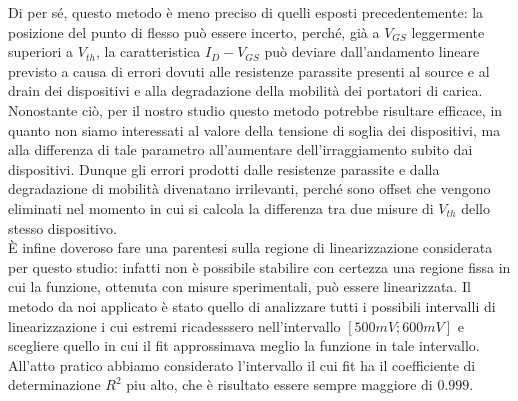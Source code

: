\documentclass[12pt, letterpaper]{book}
\begin{document}
Di per sé, questo metodo è meno preciso di quelli esposti precedentemente: la posizione del punto di flesso può essere incerto, perché, già a $V_{GS}$ leggermente superiori a $V_{th}$, la caratteristica $I_D-V_{GS}$ può deviare dall'andamento lineare previsto a causa di errori dovuti alle resistenze parassite presenti al source e al drain dei dispositivi e alla degradazione della mobilità dei portatori di carica.
Nonostante ciò, per il nostro studio questo metodo potrebbe risultare efficace, in quanto non siamo interessati al valore della tensione di soglia dei dispositivi, ma alla differenza di tale parametro all'aumentare dell'irraggiamento subito dai dispositivi. Dunque gli errori prodotti dalle resistenze parassite e dalla degradazione di mobilità divenatano irrilevanti, perché sono offset che vengono eliminati nel momento in cui si calcola la differenza tra due misure di $V_{th}$ dello stesso dispositivo.\\
È infine doveroso fare una parentesi sulla regione di linearizzazione considerata per questo studio: infatti non è possibile stabilire con certezza una regione fissa in cui la funzione, ottenuta con misure sperimentali, può essere linearizzata. Il metodo da noi applicato è stato quello di analizzare tutti i possibili intervalli di linearizzazione i cui estremi ricadesssero nell'intervallo $[500 mV ; 600mV]$ e scegliere quello in cui il fit approssimava meglio la funzione in tale intervallo. All'atto pratico abbiamo considerato l'intervallo il cui fit ha il coefficiente di determinazione $R^2$ piu alto, che è risultato essere sempre maggiore di $0.999$.
\end{document}
